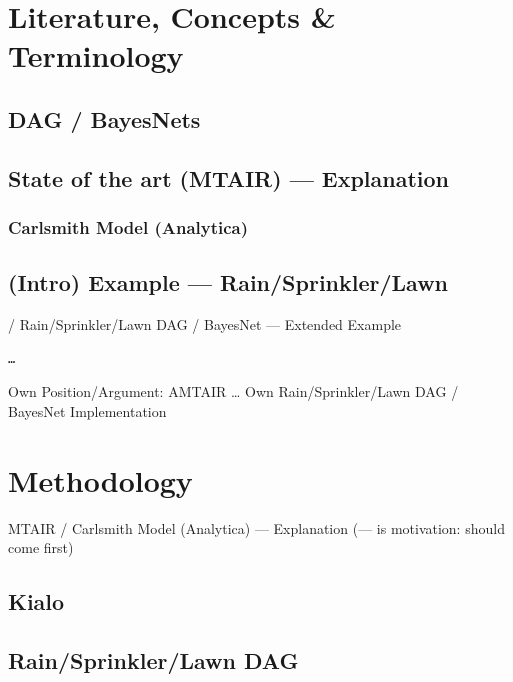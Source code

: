 \documentclass[
  letterpaper,
]{book}
\begin{document}
\section{Literature, Concepts \&
Terminology}\label{literature-concepts-terminology}

\subsection{DAG / BayesNets}\label{dag-bayesnets}

\subsection{State of the art (MTAIR) ---
Explanation}\label{state-of-the-art-mtair-explanation}

\subsubsection{Carlsmith Model
(Analytica)}\label{carlsmith-model-analytica}

\subsection{(Intro) Example ---
Rain/Sprinkler/Lawn}\label{intro-example-rainsprinklerlawn}

/ Rain/Sprinkler/Lawn DAG / BayesNet --- Extended Example

\begin{verbatim}
…
\end{verbatim}

Own Position/Argument: AMTAIR \ldots{} Own Rain/Sprinkler/Lawn DAG /
BayesNet Implementation

\section{Methodology}\label{methodology}

MTAIR / Carlsmith Model (Analytica) --- Explanation (--- is motivation:
should come first)

\subsection{Kialo}\label{kialo}

\subsection{Rain/Sprinkler/Lawn DAG}\label{rainsprinklerlawn-dag}
\end{document}

